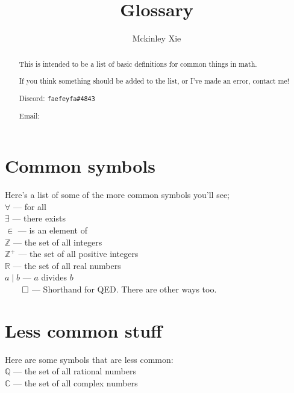 \documentclass[a4paper]{scrartcl}
\title{Glossary}
\author{Mckinley Xie}
\newcommand{\term}[2]{\\$#1$  ---  #2}
\begin{document}
\maketitle
\begin{abstract}
	This is intended to be a list of basic definitions for common things in math.

	If you think something should be added to the list, or I've made an error, contact me!

	Discord: \texttt{faefeyfa\#4843}

	Email: 
\end{abstract}
\section{Common symbols}
Here's a list of some of the more common symbols you'll see;
	\term{\forall}{for all} 
	\term{\exists}{there exists} 
	\term{\in}{is an element of}
	\term{\mathbb{Z}}{the set of all integers}
	\term{\mathbb{Z}^+}{the set of all positive integers}
	\term{\mathbb{R}}{the set of all real numbers}
	\term{a \mid b}{$a$ divides $b$}
	\term{\qed}{Shorthand for QED. There are other ways too.}
\section{Less common stuff}
Here are some symbols that are less common:
	\term{\mathbb{Q}}{the set of all rational numbers}
	\term{\mathbb{C}}{the set of all complex numbers}
\end{document}
